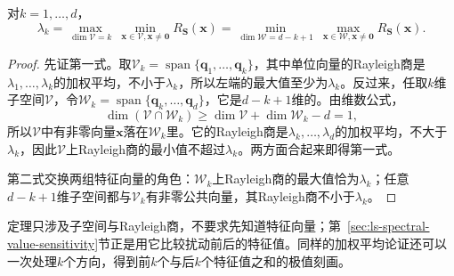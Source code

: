 \begin{theorem}
\label{thm:matrix-analysis-courant-fischer}
\label{eq:matrix-analysis-courant-fischer}
对$k=1,\ldots,d$，
\begin{equation*}
 \lambda_k=\max_{\dim\mathcal V=k}\ \min_{\bm x\in\mathcal V,\bm x\neq\bm0}R_{\bm S}(\bm x)
 =\min_{\dim\mathcal W=d-k+1}\ \max_{\bm x\in\mathcal W,\bm x\neq\bm0}R_{\bm S}(\bm x).
\end{equation*}
\end{theorem}
\begin{proof}
先证第一式。取$\mathcal V_k=\operatorname{span}\{\bm q_1,\dots,\bm q_k\}$，其中单位向量的Rayleigh商是$\lambda_1,\ldots,\lambda_k$的加权平均，不小于$\lambda_k$，所以左端的最大值至少为$\lambda_k$。反过来，任取$k$维子空间$\mathcal V$，令$\mathcal W_k=\operatorname{span}\{\bm q_k,\dots,\bm q_d\}$，它是$d-k+1$维的。由维数公式，
\[
 \dim(\mathcal V\cap\mathcal W_k)\geq\dim\mathcal V+\dim\mathcal W_k-d=1,
\]
所以$\mathcal V$中有非零向量$\bm x$落在$\mathcal W_k$里。它的Rayleigh商是$\lambda_k,\ldots,\lambda_d$的加权平均，不大于$\lambda_k$，因此$\mathcal V$上Rayleigh商的最小值不超过$\lambda_k$。两方面合起来即得第一式。

第二式交换两组特征向量的角色：$\mathcal W_k$上Rayleigh商的最大值恰为$\lambda_k$；任意$d-k+1$维子空间都与$\mathcal V_k$有非零公共向量，其Rayleigh商不小于$\lambda_k$。
\end{proof}
定理只涉及子空间与Rayleigh商，不要求先知道特征向量；第~\ref{sec:ls-spectral-value-sensitivity}节正是用它比较扰动前后的特征值。同样的加权平均论证还可以一次处理$k$个方向，得到前$k$个与后$k$个特征值之和的极值刻画。

